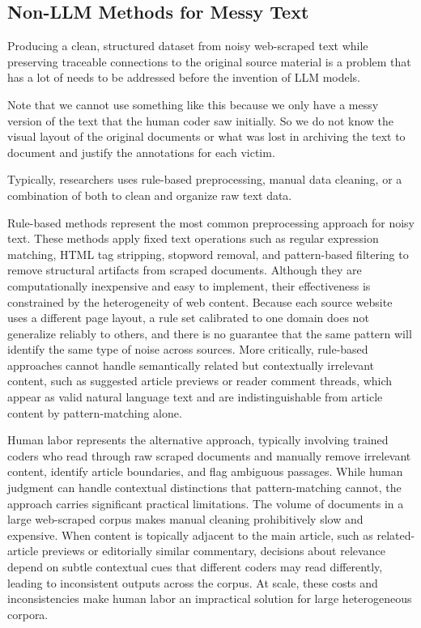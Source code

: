 \documentclass{article}
\begin{document}
\subsection{Non-LLM Methods for Messy
Text}\label{non-llm-methods-for-messy-text}

Producing a clean, structured dataset from noisy web-scraped text while preserving traceable connections to the original source material is a problem that has a lot of needs to be addressed before the invention of LLM models.

Note that we cannot use something like this because we only have a messy version of the text that the human coder saw initially.  So we do not know the visual layout of the original documents or what was lost in archiving the text to document and justify the annotations for each victim.

Typically, researchers uses rule-based preprocessing, manual data cleaning, or a combination of both to clean and organize raw text data.

Rule-based methods represent the most common preprocessing approach for noisy text. These methods apply fixed text operations such as regular expression matching, HTML tag stripping, stopword removal, and pattern-based filtering to remove structural artifacts from scraped documents. Although they are computationally inexpensive and easy to implement, their effectiveness is constrained by the heterogeneity of web content. Because each source website uses a different page layout, a rule set calibrated to one domain does not generalize reliably to others, and there is no guarantee that the same pattern will identify the same type of noise across sources. More critically, rule-based approaches cannot handle semantically related but contextually irrelevant content, such as suggested article previews or reader comment threads, which appear as valid natural language text and are indistinguishable from article content by pattern-matching alone. 

Human labor represents the alternative approach, typically involving trained coders who read through raw scraped documents and manually remove irrelevant content, identify article boundaries, and flag ambiguous passages. While human judgment can handle contextual distinctions that pattern-matching cannot, the approach carries significant practical limitations. The volume of documents in a large web-scraped corpus makes manual cleaning prohibitively slow and expensive. When content is topically adjacent to the main article, such as related-article previews or editorially similar commentary, decisions about relevance depend on subtle contextual cues that different coders may read differently, leading to inconsistent outputs across the corpus. At scale, these costs and inconsistencies make human labor an impractical solution for large heterogeneous corpora.
\end{document}
